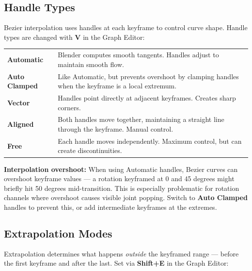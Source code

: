 \subsection{Handle Types}
\label{subsec:handle-types}

Bezier interpolation uses handles at each keyframe to control curve shape. Handle types are changed with \textbf{V} in the Graph Editor:

\begin{center}
\begin{tabularx}{\textwidth}{L{3cm}X}
\toprule
{}
 &  \\
\midrule
\textbf{Automatic} & Blender computes smooth tangents. Handles adjust to maintain smooth flow. \\
\textbf{Auto Clamped} & Like Automatic, but prevents overshoot by clamping handles when the keyframe is a local extremum. \\
\textbf{Vector} & Handles point directly at adjacent keyframes. Creates sharp corners. \\
\textbf{Aligned} & Both handles move together, maintaining a straight line through the keyframe. Manual control. \\
\textbf{Free} & Each handle moves independently. Maximum control, but can create discontinuities. \\
\bottomrule
\end{tabularx}
\end{center}

\begin{warningbox}
\textbf{Interpolation overshoot:} When using Automatic handles, Bezier curves can overshoot keyframe values --- a rotation keyframed at 0 and 45 degrees might briefly hit 50 degrees mid-transition. This is especially problematic for rotation channels where overshoot causes visible joint popping. Switch to \textbf{Auto Clamped} handles to prevent this, or add intermediate keyframes at the extremes.
\end{warningbox}

\subsection{Extrapolation Modes}
\label{subsec:extrapolation}

Extrapolation determines what happens \textit{outside} the keyframed range --- before the first keyframe and after the last. Set via \textbf{Shift+E} in the Graph Editor:

